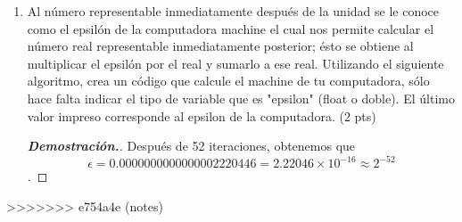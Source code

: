 \documentclass{article}
\begin{document}
\begin{enumerate}
		
		\item Al n\'umero representable inmediatamente despu\'es de la unidad se le conoce como el epsil\'on de la computadora
		machine el cual nos permite calcular el n\'umero real representable inmediatamente posterior; \'esto se obtiene
		al multiplicar el epsil\'on por el real y sumarlo a ese real. Utilizando el siguiente algoritmo, crea un c\'odigo
		que calcule el machine de tu computadora, s\'olo hace falta indicar el tipo de variable que es "epsilon" (float o
		doble). El \'ultimo valor impreso corresponde al epsilon de la computadora. (2 pts)
		\begin{mdframed}[
			linecolor=darkgray,
			backgroundcolor=pearl]
			\begin{proof}[\textbf{Demostraci\'on.}]
				Despu\'es de 52 iteraciones, obtenemos que $$\epsilon = 0.0000000000000002220446 = 2.22046\times10^{-16} \approx 2^{-52}$$.
				
			\end{proof}
		\end{mdframed}
		
	\end{enumerate}
>>>>>>> e754a4e (notes)
\end{document}
